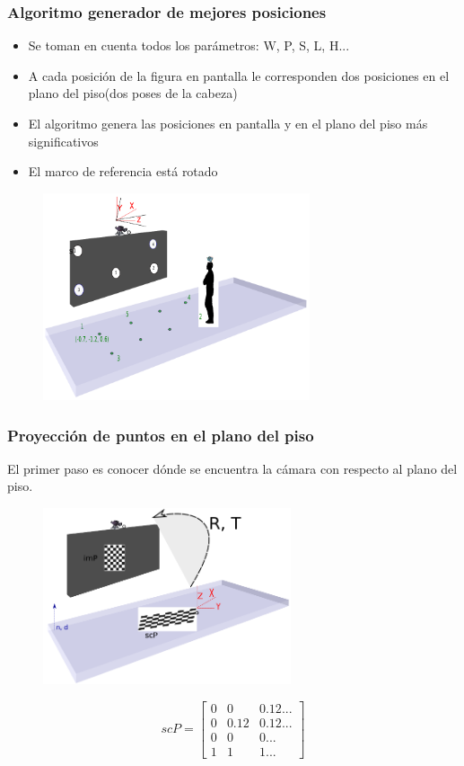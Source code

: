 \documentclass[10pt, compress]{beamer}
\begin{document}
\begin{frame}[fragile]
	\frametitle{Algoritmo generador de mejores posiciones}
	\begin{itemize}
		\item Se toman en cuenta todos los parámetros: W, P, S, L, H...
		\item A cada posición de la figura en pantalla le corresponden dos posiciones en el plano del piso(dos poses de la cabeza)
		\item El algoritmo genera las posiciones en pantalla y en el plano del piso más significativos
		\item El marco de referencia está rotado
	\end{itemize}
	\begin{figure}[htbp]
		\includegraphics[width=0.7\textwidth]{./pictures/puntos}
	\end{figure}
	
\end{frame}

\begin{frame}[fragile]
	\frametitle{Proyección de puntos en el plano del piso}
El primer paso es conocer dónde se encuentra la cámara con respecto al plano del piso.
	\begin{figure}[htbp]
		\includegraphics[width=0.65\textwidth]{./pictures/rt}
	\end{figure}
	    {\small\[scP=
	    \begin{bmatrix}
	    0 & 0 & 0.12...\\
	    0 & 0.12 & 0.12...\\
	    0 & 0 & 0...\\
	    1 & 1 & 1... 
	    \end{bmatrix}
	    \]}

\end{frame}
\end{document}
